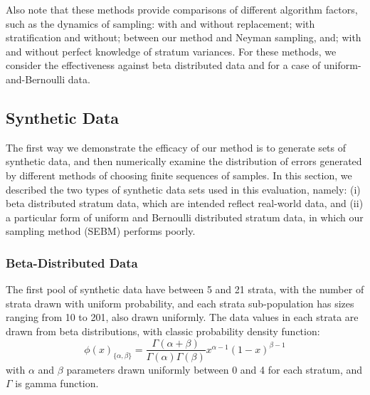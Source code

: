 \documentclass[]{interact}
\theoremstyle{plain}%
\theoremstyle{definition}
\theoremstyle{remark}
\begin{document}
Also note that these methods provide comparisons of different algorithm factors, such as the dynamics of sampling: with and without replacement; with stratification and without; between our method and Neyman sampling, and; with and without perfect knowledge of stratum variances. 
For these methods, we consider the effectiveness against beta distributed data and for a case of uniform-and-Bernoulli data.

\subsection{Synthetic Data}
\label{ssec:SyntheticDists}
The first way we demonstrate the efficacy of our method is to generate sets of synthetic data, and then numerically examine the distribution of errors generated by different methods of choosing finite sequences of samples.
In this section, we described the two types of synthetic data sets used in this evaluation, namely: 
(i) beta distributed stratum data, which are intended reflect real-world data, and 
(ii) a particular form of uniform and Bernoulli distributed stratum data, in which our sampling method (SEBM) performs poorly.

\subsubsection{Beta-Distributed Data}
The first pool of synthetic data %
have between 5 and 21 strata, with the number of strata drawn with uniform probability, 
and each strata sub-population has sizes ranging from 10 to 201, also drawn uniformly.
The data values in each strata are drawn from beta distributions, with classic probability density function:
$$\phi(x)_{\{\alpha,\beta\}}
=\frac{\Gamma(\alpha+\beta)}{\Gamma(\alpha)\Gamma(\beta)}     
    x^{\alpha-1}(1-x)^{\beta-1} $$
with $\alpha$ and $\beta$ parameters drawn uniformly between 0 and 4 for each stratum, and $\Gamma$ is gamma function.

%
\end{document}
